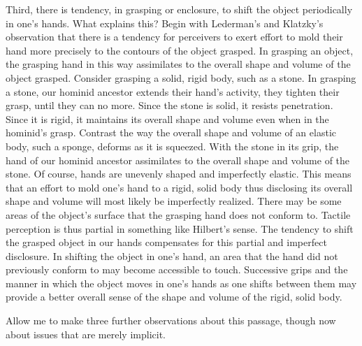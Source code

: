 Third, there is tendency, in grasping or enclosure, to shift the object periodically in one's hands. What explains this? Begin with Lederman's and Klatzky's \citeyearpar{Lederman:1987fr} observation that there is a tendency for perceivers to exert effort to mold their hand more precisely to the contours of the object grasped. In grasping an object, the grasping hand in this way assimilates to the overall shape and volume of the object grasped. Consider grasping a solid, rigid body, such as a stone. In grasping a stone, our hominid ancestor extends their hand's activity, they tighten their grasp, until they can no more. Since the stone is solid, it resists penetration. Since it is rigid, it maintains its overall shape and volume even when in the hominid's grasp. Contrast the way the overall shape and volume of an elastic body, such a sponge, deforms as it is squeezed. With the stone in its grip, the hand of our hominid ancestor assimilates to the overall shape and volume of the stone. Of course, hands are unevenly shaped and imperfectly elastic. This means that an effort to mold one's hand to a rigid, solid body thus disclosing its overall shape and volume will most likely be imperfectly realized. There may be some areas of the object's surface that the grasping hand does not conform to. Tactile perception is thus partial in something like Hilbert's \citeyearpar{Hilbert:1987jq} sense. The tendency to shift the grasped object in our hands compensates for this partial and imperfect disclosure. In shifting the object in one's hand, an area that the hand did not previously conform to may become accessible to touch. Successive grips and the manner in which the object moves in one's hands as one shifts between them may provide a better overall sense of the shape and volume of the rigid, solid body. 

Allow me to make three further observations about this passage, though now about issues that are merely implicit.

